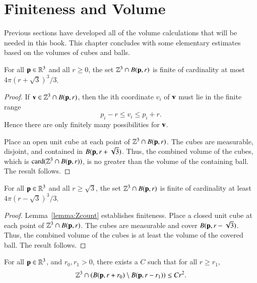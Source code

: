 \section{Finiteness and Volume}

Previous sections have developed all of the volume calculations that will
be needed in this book.  This chapter concludes with some 
elementary estimates based on the volumes of  cubes and balls.

\begin{lemma}
    For all ${\mathbf p}\in\mathbb{R}^3$ and all $r\ge 0$, the set
    $\mathbb{Z}^3\cap B({\mathbf p},r)$ is finite of cardinality at most
    $4\pi (r+\sqrt3)^3/3$.
%
\end{lemma}

\begin{proof}  If ${\mathbf v}\in\mathbb{Z}^3\cap B({\mathbf p},r)$, then the ith
coordinate $v_i$ of ${\mathbf v}$ must lie in the finite range
    \begin{displaymath}
    p_i - r \le v_i \le p_i + r.
    \end{displaymath}
Hence there are only finitely many possibilities for ${\mathbf v}$.


Place an open unit cube at each point of $\mathbb{Z}^3\cap B({\mathbf p},r)$.
The cubes are measurable, disjoint, and contained in
$B({\mathbf p},r+\sqrt3)$.  Thus, the combined volume of the cubes, which is
${\operatorname{card}}(\mathbb{Z}^3\cap B({\mathbf p},r))$,  is no greater than the volume of the
containing ball.  The result follows.
\end{proof}

\begin{lemma}
  For all ${\mathbf p}\in\mathbb{R}^3$ and all $r\ge\sqrt3$, the set
    $\mathbb{Z}^3\cap B({\mathbf p},r)$ is finite of cardinality at least
    $4\pi (r-\sqrt3)^3/3$.
\end{lemma}

\begin{proof}  Lemma~\ref{lemma:Zcount} establishes finiteness.  Place a closed unit cube at each point
of $\mathbb{Z}^3\cap B({\mathbf p},r)$.  The cubes are measurable and cover
$B({\mathbf p},r-\sqrt3)$.  Thus, the combined volume of the cubes is at
least the volume of the covered ball.  The result follows.
\end{proof}

\begin{lemma}
For all ${\mathbf p}\in\mathbb{R}^3$, and $r_0,r_1>0$, there exists a $C$ such
that for all $r\ge r_1$, 
\begin{displaymath}
  \mathbb{Z}^3 \cap (B({\mathbf p},r+r_0) \setminus B({\mathbf p},r-r_1)) \le C r^2.
\end{displaymath}
\end{lemma}

